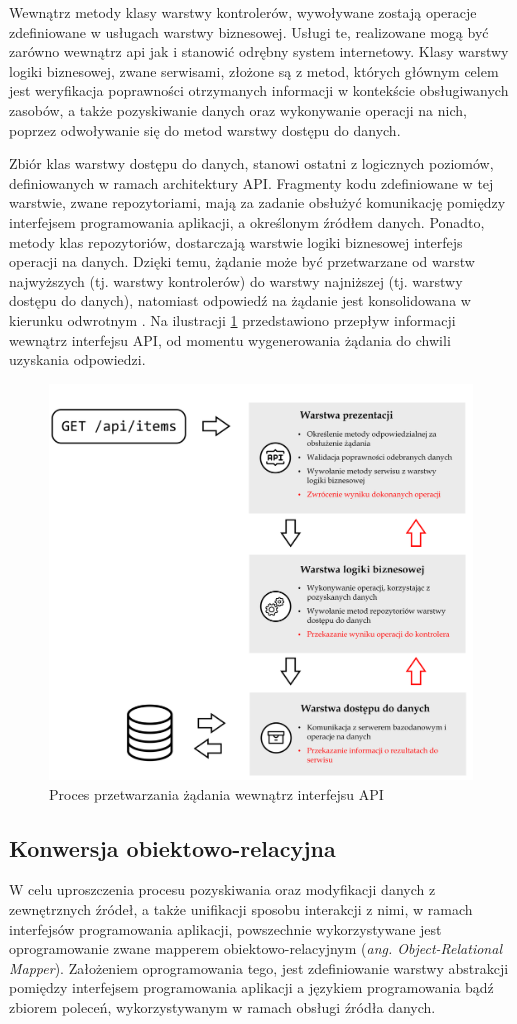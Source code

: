 Wewnątrz metody klasy warstwy kontrolerów, wywoływane zostają operacje zdefiniowane w usługach warstwy biznesowej. Usługi te, realizowane mogą być zarówno wewnątrz api jak i stanowić odrębny system internetowy. Klasy warstwy logiki biznesowej, zwane serwisami, złożone są z metod, których głównym celem jest weryfikacja poprawności otrzymanych informacji w kontekście obsługiwanych zasobów, a także pozyskiwanie danych oraz wykonywanie operacji na nich, poprzez odwoływanie się do metod warstwy dostępu do danych.

Zbiór klas warstwy dostępu do danych, stanowi ostatni z logicznych poziomów, definiowanych w ramach architektury API. Fragmenty kodu zdefiniowane w tej warstwie, zwane repozytoriami, mają za zadanie obsłużyć komunikację pomiędzy interfejsem programowania aplikacji, a określonym źródłem danych. Ponadto, metody klas repozytoriów, dostarczają warstwie logiki biznesowej interfejs operacji na danych. Dzięki temu, żądanie może być przetwarzane od warstw najwyższych (tj. warstwy kontrolerów) do warstwy najniższej (tj. warstwy dostępu do danych), natomiast odpowiedź na żądanie jest konsolidowana w kierunku odwrotnym \cite{kambalyal20103}. Na ilustracji \ref{fig:architektura-api} przedstawiono przepływ informacji wewnątrz interfejsu API, od momentu wygenerowania żądania do chwili uzyskania odpowiedzi.

\begin{figure}[ht]
 \centering
  \includegraphics[width=0.6\linewidth]{rys02/architektura-api}
 \caption{Proces przetwarzania żądania wewnątrz interfejsu API}
 \label{fig:architektura-api}
\end{figure}
 
\subsection*{Konwersja obiektowo-relacyjna}
W celu uproszczenia procesu pozyskiwania oraz modyfikacji danych z zewnętrznych źródeł, a także unifikacji sposobu interakcji z nimi, w ramach interfejsów programowania aplikacji, powszechnie wykorzystywane jest oprogramowanie zwane mapperem obiektowo-relacyjnym (\textit{ang. Object-Relational Mapper}). Założeniem oprogramowania tego, jest zdefiniowanie warstwy abstrakcji pomiędzy interfejsem programowania aplikacji a językiem programowania bądź zbiorem poleceń, wykorzystywanym w ramach obsługi źródła danych.

